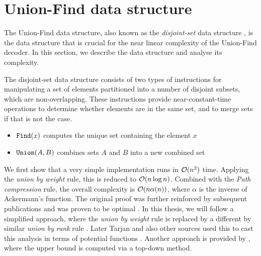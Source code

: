 \chapter{Union-Find data structure}\label{ap:unionfind}
The Union-Find data structure, also known as the \emph{disjoint-set} data structure \cite{tarjan1975efficiency}, is the data structure that is crucial for the near linear complexity of the Union-Find decoder. In this section, we describe the data structure and analyse its complexity. 

The disjoint-set data structure consists of two types of instructions for manipulating a set of elements partitioned into a number of disjoint subsets, which are non-overlapping. These instructions provide near-constant-time operations to determine whether elements are in the same set, and to merge sets if that is not the case. 
\begin{itemize}
  \item $\texttt{Find}(x)$ computes the unique set containing the element $x$
  \item $\texttt{Union}(A,B)$ combines sets $A$ and $B$ into a new combined set
\end{itemize}
We first show that a very simple implementation runs in $\mathcal{O}(n^2)$ time. Applying the \emph{union by weight} rule, this is reduced to $\mathcal{O}(n \log n)$. Combined with the \emph{Path compression} rule, the overall complexity is $\mathcal{O}(n \alpha (n))$, where $\alpha$ is the inverse of Ackermann's function. The original proof \cite{tarjan1975efficiency} was further reinforced by subsequent publications \cite{tarjan1979class,tarjan1984worst} and was proven to be optimal \cite{fredman1989cell}. In this thesis, we will follow a simplified approach, where the \emph{union by weight} rule is replaced by a different by similar \emph{union by rank} rule \cite{kozen1992design}. Later Tarjan and also other sources used this to cast this analysis in terms of potential functions \cite{tarjan1999handout, harfst2000potential, cormen2009introduction}. Another approach is provided by \cite{seidel2005top}, where the upper bound is computed via a top-down method. 

